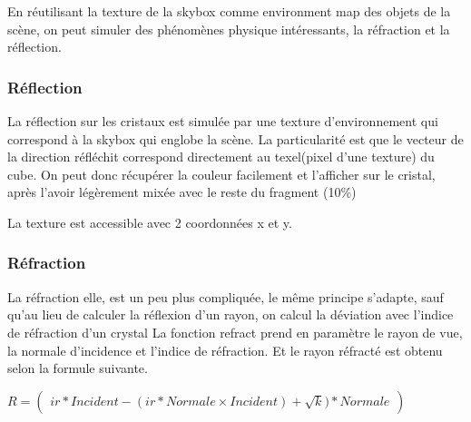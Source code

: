 \documentclass[11pt, a4paper, titlepage]{article}
\begin{document}
En réutilisant la texture de la skybox comme environment map des objets de la scène, on peut simuler des
phénomènes physique intéressants, la réfraction et la réflection.

\subsubsection{Réflection}
La réflection sur les cristaux est simulée par une texture d'environnement qui correspond à la skybox
qui englobe la scène.
La particularité est que le vecteur de la direction réfléchit correspond directement au texel(pixel d'une texture)
du cube. On peut donc récupérer la couleur facilement et l'afficher sur le cristal, après
l'avoir légèrement mixée avec le reste du fragment (10\%)

La texture est accessible avec 2 coordonnées x et y.

\subsubsection{Réfraction}
La réfraction elle, est un peu plus compliquée, le même principe s'adapte, sauf qu'au lieu de
calculer la réflexion d'un rayon, on calcul la déviation avec l'indice de réfraction d'un crystal
La fonction refract prend en paramètre le rayon de vue, la normale d'incidence et l'indice de réfraction.
Et le rayon réfracté est obtenu selon la formule suivante.

\begin{math}
R =
\begin{pmatrix}
ir * Incident - (ir * Normale \times Incident) + \sqrt{k}) * Normale
\end{pmatrix}
\end{math}
\end{document}
